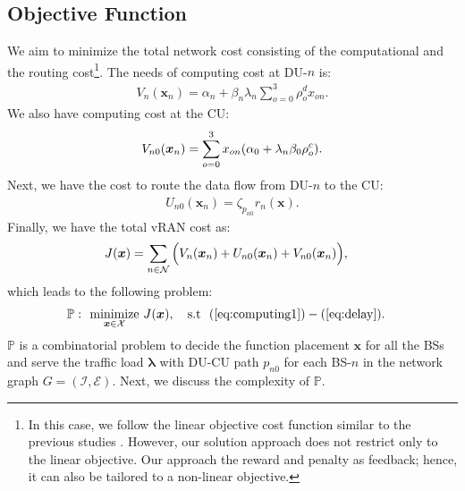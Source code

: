 \subsection{Objective Function}
We aim to minimize the total network cost consisting of the computational  and the routing cost\footnote{In this case, we follow the linear objective cost function similar to the previous studies \cite{fluidran_andres,vranmec_andres}. However, our solution approach does not restrict only to the linear objective. Our approach  the  reward and penalty as feedback; hence, it can also be tailored to a non-linear objective.}. The needs of computing cost  at DU-$n$ is:
%
\begin{align} \label{eq:cost-du}
V_n(\bm{x}_n) = \alpha_n + \beta_n \lambda_{n} \sum_{o=0}^{3}\rho_{o}^{d} x_{on}.
\end{align} 
%
We also have  computing cost  at the CU:
%
\begin{align} \label{eq:cost-cu}
{\color{black}V_{n0}(\bm{x}_n)} = \sum_{o=0}^3 x_{on} (\alpha_0 + \lambda_{n} \beta_0 \rho_{o}^{c} ).
\end{align} 
%
Next, we have the cost to route the data flow from DU-$n$ to the CU:
%
\begin{align} \label{eq:cost-route}
U_{n0}(\bm{x}_n) =  \zeta_{p_{n0}} r_n (\bm{x}).
\end{align} 
%
Finally, we have the total vRAN cost as:
%
\begin{align} \label{eq: total-cost}
J(\bm{x}) &= \sum_{n \in \mathcal{N}} \Big(  V_n(\bm{x}_n) + U_{n0}(\bm{x}_n) +{\color{black} V_{n0}(\bm{x}_n}) \Big), \end{align}
which leads to the following problem:
%
\begin{align}
\mathbb{P}: \,\,\,\, & \underset{\bm{x} \in \mathcal{X}}{\text{minimize}} \   J(\bm{x}), \ \ \ \notag  \text{s.t} \ \  
 (\ref{eq:computing1}) - (\ref{eq:delay}). \notag
\end{align}
%
$\mathbb{P}$ is a combinatorial problem to decide the function placement $\bm{x}$ for all the BSs and serve the traffic load $\bm{\lambda}$ with DU-CU path $p_{n0}$ for each BS-$n$ in the network graph $G = (\mathcal{I}, \mathcal{E})$. Next, we discuss the complexity of $\mathbb{P}$.

